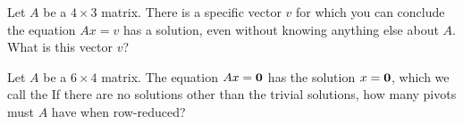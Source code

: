 \endedxproblem




Let $A$ be a $4\times 3$ matrix.  There is a specific 
vector $v$ for which you can conclude the equation $Ax = v$ has a solution, even without knowing
anything else about $A$.  What is this vector $v$?  






\endedxproblem




\endedxvertical











Let $A$ be a $6\times 4$ matrix.  The equation $Ax = \mathbf{0}$ has the solution $x = \mathbf{0}$, which we
call the  {}  If there are no solutions other than the trivial solutions,
how many pivots must $A$ have when row-reduced?  



